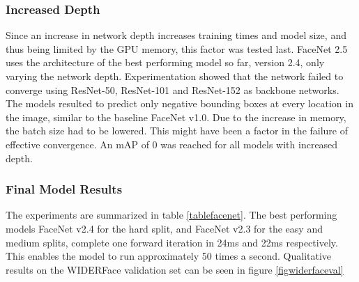 \documentclass[a4paper, twoside]{article}
\begin{document}
\subsubsection{Increased Depth}
Since an increase in network depth increases training times and model size, and thus being limited by the GPU memory, this factor was tested last. FaceNet 2.5 uses the architecture of the best performing model so far, version 2.4, only varying the network depth. Experimentation showed that the network failed to converge using ResNet-50, ResNet-101 and ResNet-152 as backbone networks. The models resulted to predict only negative bounding boxes at every location in the image, similar to the baseline FaceNet v1.0. Due to the increase in memory, the batch size had to be lowered. This might have been a factor in the failure of effective convergence. An mAP of 0 was reached for all models with increased depth.

\subsubsection{Final Model Results}
The experiments are summarized in table \ref{tablefacenet}. The best performing models FaceNet v2.4 for the hard split, and FaceNet v2.3 for the easy and medium splits, complete one forward iteration in 24ms and 22ms respectively. This enables the model to run approximately 50 times a second. Qualitative results on the WIDERFace validation set can be seen in figure \ref{figwiderfaceval}
\end{document}
